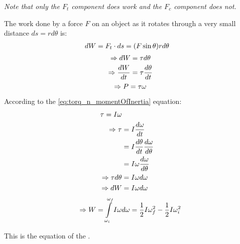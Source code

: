         \par \textit{Note that only the $F_{t}$ component does work and the $F_{c}$ component
        does not.}
        \par The work done by a force $F$ on an object as it rotates through a very small
        distance $ds = rd\theta$ is:
        \begin{align*}
            dW & = F_{t} \cdot ds = (F \sin \theta) r d \theta
        \end{align*}
        \begin{equation}
            \Rightarrow dW = \tau d \theta 
        \end{equation}
        \begin{align*}
            \Rightarrow \dfrac{dW}{dt} = \tau \dfrac{d \theta}{dt}
        \end{align*}
        \begin{equation}
            \Rightarrow P = \tau \omega 
        \end{equation}

            \par According to the \eqref{eq:torq_n_momentOfInertia} equation:
            \begin{align*}
                \tau = I \omega \\
                \Rightarrow \tau & = I \dfrac{d\omega}{dt} \\
                & = I \dfrac{d \theta}{dt} \dfrac{d \omega}{d \theta} \\
                & = I \omega \dfrac{d \omega}{d \theta} \\
                \Rightarrow \tau d \theta & = I \omega d \omega \\
                \Rightarrow dW & = I \omega d \omega
            \end{align*}
            \begin{equation}
                \Rightarrow W = {\int\limits _{\omega_{i}}^{\omega_{f}} I \omega d \omega}
                = \dfrac{1}{2} I \omega_{f}^{2} - \dfrac{1}{2} I \omega_{i}^{2}
            \end{equation}
            \par This is the equation of the .
